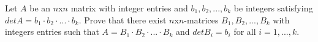 Let $A$ be an $n$x$n$ matrix with integer entries and $b_{1},b_{2},...,b_{k}$ be integers satisfying $detA=b_{1}\cdot b_{2}\cdot ...\cdot b_{k}$. Prove that there exist $n$x$n$-matrices $B_{1},B_{2},...,B_{k}$ with integers entries such that $A=B_{1}\cdot B_{2}\cdot ...\cdot B_{k}$ and $detB_{i}=b_{i}$ for all $i=1,...,k$.